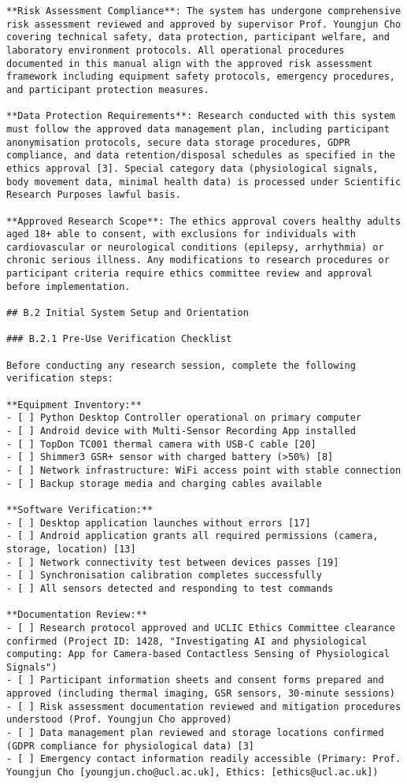\begin{verbatim}
**Risk Assessment Compliance**: The system has undergone comprehensive risk assessment reviewed and approved by supervisor Prof. Youngjun Cho covering technical safety, data protection, participant welfare, and laboratory environment protocols. All operational procedures documented in this manual align with the approved risk assessment framework including equipment safety protocols, emergency procedures, and participant protection measures.

**Data Protection Requirements**: Research conducted with this system must follow the approved data management plan, including participant anonymisation protocols, secure data storage procedures, GDPR compliance, and data retention/disposal schedules as specified in the ethics approval [3]. Special category data (physiological signals, body movement data, minimal health data) is processed under Scientific Research Purposes lawful basis.

**Approved Research Scope**: The ethics approval covers healthy adults aged 18+ able to consent, with exclusions for individuals with cardiovascular or neurological conditions (epilepsy, arrhythmia) or chronic serious illness. Any modifications to research procedures or participant criteria require ethics committee review and approval before implementation.

## B.2 Initial System Setup and Orientation

### B.2.1 Pre-Use Verification Checklist

Before conducting any research session, complete the following verification steps:

**Equipment Inventory:**
- [ ] Python Desktop Controller operational on primary computer
- [ ] Android device with Multi-Sensor Recording App installed
- [ ] TopDon TC001 thermal camera with USB-C cable [20]
- [ ] Shimmer3 GSR+ sensor with charged battery (>50%) [8]
- [ ] Network infrastructure: WiFi access point with stable connection
- [ ] Backup storage media and charging cables available

**Software Verification:**
- [ ] Desktop application launches without errors [17]
- [ ] Android application grants all required permissions (camera, storage, location) [13]
- [ ] Network connectivity test between devices passes [19]
- [ ] Synchronisation calibration completes successfully
- [ ] All sensors detected and responding to test commands

**Documentation Review:**
- [ ] Research protocol approved and UCLIC Ethics Committee clearance confirmed (Project ID: 1428, "Investigating AI and physiological computing: App for Camera-based Contactless Sensing of Physiological Signals")
- [ ] Participant information sheets and consent forms prepared and approved (including thermal imaging, GSR sensors, 30-minute sessions)
- [ ] Risk assessment documentation reviewed and mitigation procedures understood (Prof. Youngjun Cho approved)
- [ ] Data management plan reviewed and storage locations confirmed (GDPR compliance for physiological data) [3]
- [ ] Emergency contact information readily accessible (Primary: Prof. Youngjun Cho [youngjun.cho@ucl.ac.uk], Ethics: [ethics@ucl.ac.uk])


\end{verbatim}
